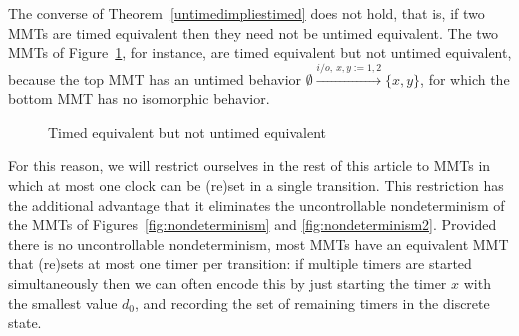 The converse of Theorem~\ref{untimedimpliestimed} does not hold, that is,
if two MMTs are timed equivalent then they need not be untimed equivalent. 
The two MMTs of Figure~\ref{fig:twoequivalentone}, for instance,
are timed equivalent but not untimed equivalent,
because the top MMT has an untimed behavior
$ \emptyset \xrightarrow{i/o,~ x, y:=1,2 } \{ x, y \}$, for which the bottom MMT has no isomorphic behavior.
\begin{figure}
\begin{center}

\vspace{1 em}
\caption{Timed equivalent but not untimed equivalent}
\label{fig:twoequivalentone}
\end{center}
\end{figure}
For this reason, we will restrict ourselves in the rest of this article to MMTs in which at most
one clock can be (re)set in a single transition. This restriction has the additional advantage that it
eliminates the uncontrollable nondeterminism
of the MMTs of Figures~\ref{fig:nondeterminism} and \ref{fig:nondeterminism2}.
Provided there is no uncontrollable nondeterminism, most MMTs
have an equivalent MMT that (re)sets at most one timer per transition:
if multiple timers are started simultaneously then we can often encode this by just
starting the timer $x$ with the smallest value $d_0$, and recording the set of remaining timers in the discrete state.
